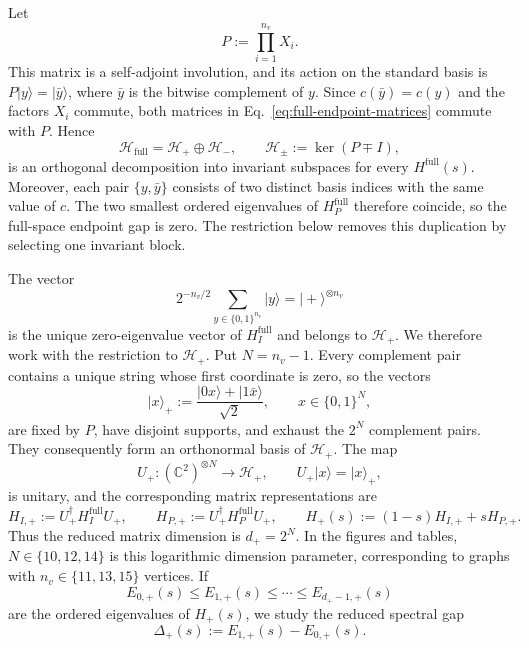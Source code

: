 \documentclass[11pt, a4paper]{article}
\newcommand{\ket}[1]{| #1 \rangle}
\begin{document}
Let
\begin{equation}
P:=\prod_{i=1}^{n_v}X_i.
\end{equation}
This matrix is a self-adjoint involution, and its action on the standard basis is $P\ket{y}=\ket{\bar y}$, where $\bar y$ is the bitwise complement of $y$. Since $c(\bar y)=c(y)$ and the factors $X_i$ commute, both matrices in Eq.~\eqref{eq:full-endpoint-matrices} commute with $P$. Hence
\begin{equation}
\mathcal H_{\mathrm{full}}=\mathcal H_+\oplus\mathcal H_-,
\qquad
\mathcal H_\pm:=\ker(P\mp I),
\end{equation}
is an orthogonal decomposition into invariant subspaces for every $H^{\mathrm{full}}(s)$. Moreover, each pair $\{y,\bar y\}$ consists of two distinct basis indices with the same value of $c$. The two smallest ordered eigenvalues of $H_P^{\mathrm{full}}$ therefore coincide, so the full-space endpoint gap is zero. The restriction below removes this duplication by selecting one invariant block.

The vector
\begin{equation}
2^{-n_v/2}\sum_{y\in\{0,1\}^{n_v}}\ket{y}
=\ket{+}^{\otimes n_v}
\end{equation}
is the unique zero-eigenvalue vector of $H_I^{\mathrm{full}}$ and belongs to $\mathcal H_+$. We therefore work with the restriction to $\mathcal H_+$. Put $N=n_v-1$. Every complement pair contains a unique string whose first coordinate is zero, so the vectors
\begin{equation}
\label{eq:even-basis}
\ket{x}_+:=\frac{\ket{0x}+\ket{1\bar x}}{\sqrt2},
\qquad x\in\{0,1\}^N,
\end{equation}
are fixed by $P$, have disjoint supports, and exhaust the $2^N$ complement pairs. They consequently form an orthonormal basis of $\mathcal H_+$. The map
\begin{equation}
U_+:(\mathbb C^2)^{\otimes N}\longrightarrow\mathcal H_+,
\qquad U_+\ket{x}=\ket{x}_+,
\end{equation}
is unitary, and the corresponding matrix representations are
\begin{equation}
H_{I,+}:=U_+^\dagger H_I^{\mathrm{full}}U_+,
\qquad
H_{P,+}:=U_+^\dagger H_P^{\mathrm{full}}U_+,
\qquad
H_+(s):=(1-s)H_{I,+}+sH_{P,+}.
\end{equation}
Thus the reduced matrix dimension is $d_+=2^N$. In the figures and tables, $N\in\{10,12,14\}$ is this logarithmic dimension parameter, corresponding to graphs with $n_v\in\{11,13,15\}$ vertices. If
\begin{equation}
E_{0,+}(s)\le E_{1,+}(s)\le\cdots\le E_{d_+-1,+}(s)
\end{equation}
are the ordered eigenvalues of $H_+(s)$, we study the reduced spectral gap
\begin{equation}
\Delta_+(s):=E_{1,+}(s)-E_{0,+}(s).
\end{equation}
\end{document}
